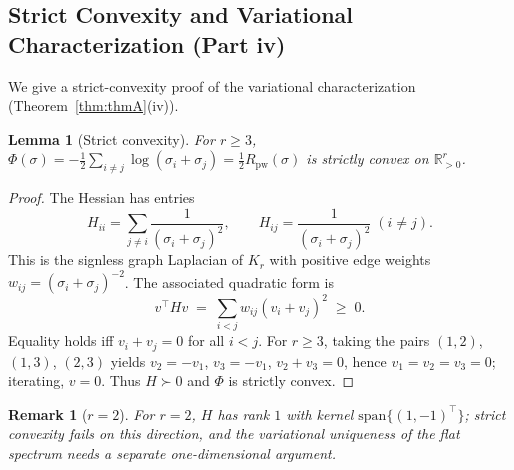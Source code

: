\documentclass{article}
\newtheorem{lemma}{Lemma}
\newtheorem{remark}{Remark}
\begin{document}
\subsection{Strict Convexity and Variational Characterization (Part iv)}
\label{app:variational}

We give a strict-convexity proof of the variational characterization (Theorem~\ref{thm:thmA}(iv)).

\begin{lemma}[Strict convexity]
\label{lem:strict_convexity}
For $r\geq 3$, $\Phi(\sigma) = -\tfrac12\sum_{i\neq j}\log(\sigma_i+\sigma_j) = \tfrac12 R_{\mathrm{pw}}(\sigma)$ is strictly convex on $\mathbb{R}^r_{>0}$.
\end{lemma}

\begin{proof}
The Hessian has entries
\[
H_{ii} = \sum_{j\neq i}\frac{1}{(\sigma_i+\sigma_j)^2},\qquad H_{ij}=\frac{1}{(\sigma_i+\sigma_j)^2}\;(i\neq j).
\]
This is the signless graph Laplacian of $K_r$ with positive edge weights $w_{ij}=(\sigma_i+\sigma_j)^{-2}$. The associated quadratic form is
\[
v^\top H v \;=\; \sum_{i<j} w_{ij}(v_i+v_j)^2 \;\geq\; 0.
\]
Equality holds iff $v_i+v_j=0$ for all $i<j$. For $r\geq 3$, taking the pairs $(1,2)$, $(1,3)$, $(2,3)$ yields $v_2 = -v_1$, $v_3=-v_1$, $v_2+v_3 = 0$, hence $v_1=v_2=v_3=0$; iterating, $v=0$. Thus $H\succ 0$ and $\Phi$ is strictly convex.
\end{proof}

\begin{remark}[$r=2$]
For $r=2$, $H$ has rank $1$ with kernel $\mathrm{span}\{(1,-1)^\top\}$; strict convexity fails on this direction, and the variational uniqueness of the flat spectrum needs a separate one-dimensional argument.
\end{remark}
\end{document}
